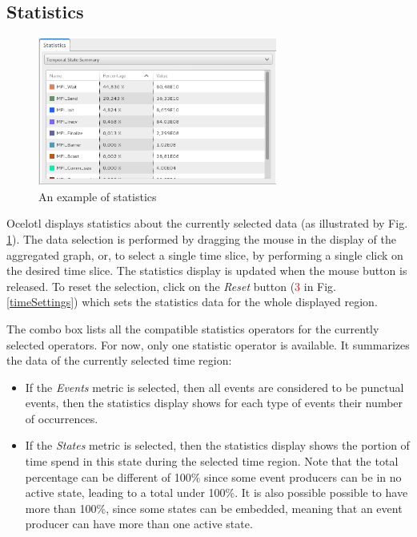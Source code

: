 \documentclass[twoside]{article}
\begin{document}
\begin{sloppypar}
\subsection{Statistics}
\begin{figure}[h!]
	\centering
	\includegraphics[width=0.7\textwidth]{images/statistics.png}
	\caption{An example of statistics}
	\label{stats}
\end{figure}
Ocelotl displays statistics about the currently selected data (as illustrated by Fig. \ref{stats}). The data selection is performed by dragging the mouse in the display of the aggregated graph, or, to select a single time slice, by performing a single click on the desired time slice. The statistics display is updated when the mouse button is released. To reset the selection, click on the \textit{Reset} button (\textcolor{red}{3} in Fig. \ref{timeSettings}) which sets the statistics data for the whole displayed region. 

The combo box lists all the compatible statistics operators for the currently selected operators. For now, only one statistic operator is available. It summarizes the data of the currently selected time region:
\begin{itemize} 
	\item If the \textit{Events} metric is selected, then all events are considered to be punctual events, then the statistics display shows for each type of events their number of occurrences.
	\item If the \textit{States} metric is selected, then the statistics display shows the portion of time spend in this state during the selected time region. Note that the total percentage can be different of 100\% since some event producers can be in no active state, leading to a total under 100\%. It is also possible possible to have more than 100\%, since some states can be embedded, meaning that an event producer can have more than one active state.
\end{itemize}


\end{sloppypar}
\end{document}

